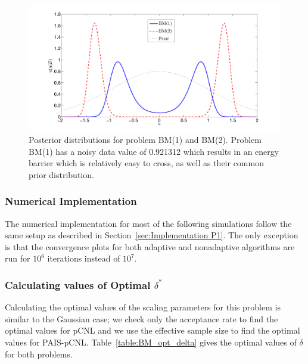 \documentclass[final]{siamltex}
\begin{document}
\begin{figure}[htpb]
\begin{center}
\includegraphics[width=\textwidth]{"figures/posteriors3"}
\caption{Posterior distributions for problem BM(1) and BM(2). Problem BM(1) has a noisy data value of  0.921312 which results in an energy barrier which is relatively easy to cross, as well as their common prior distribution.}
\label{fig:problem 3 posteriors}
\end{center}
\end{figure}

\subsubsection{Numerical Implementation}\label{sec:Implementation P2}

The numerical implementation for most of the following simulations follow the same setup as described in Section~\ref{sec:Implementation P1}. The only exception is that the convergence plots for both adaptive and nonadaptive algorithms are run for $10^6$ iterations instead of $10^7$.

\subsubsection{Calculating values of Optimal $\delta^*$}\label{sec:BM1_opt_delta}

Calculating the optimal values of the scaling parameters for this problem is similar to the Gaussian case; we check only the acceptance rate to find the optimal values for pCNL and we use the effective sample size to find the optimal values for PAIS-pCNL. Table~\ref{table:BM_opt_delta} gives the optimal values of $\delta$ for both problems.
\end{document}
